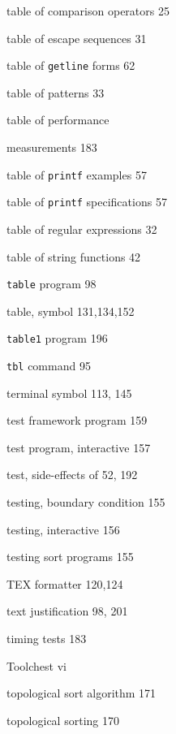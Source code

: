 \begin{multicols}{3}
\hangindent=3pc  table of comparison operators 25

\hangindent=3pc  table of escape sequences 31

\hangindent=3pc  table of \verb'getline' forms 62

\hangindent=3pc  table of patterns 33

\hangindent=3pc  table of performance

\hangindent=3pc  measurements 183

\hangindent=3pc  table of \verb'printf' examples 57

\hangindent=3pc  table of \verb'printf' specifications 57

\hangindent=3pc  table of regular expressions 32

\hangindent=3pc  table of string functions 42

\hangindent=3pc  \verb'table' program 98

\hangindent=3pc  table, symbol 131,134,152

\hangindent=3pc  \verb'table1' program 196

\hangindent=3pc  \verb'tbl' command 95

\hangindent=3pc  terminal symbol 113, 145

\hangindent=3pc  test framework program 159

\hangindent=3pc  test program, interactive 157

\hangindent=3pc  test, side-effects of 52, 192

\hangindent=3pc  testing, boundary condition 155

\hangindent=3pc  testing, interactive 156

\hangindent=3pc  testing sort programs 155

\hangindent=3pc  TEX formatter 120,124

\hangindent=3pc  text justification 98, 201

\hangindent=3pc  timing tests 183

\hangindent=3pc  Toolchest vi

\hangindent=3pc  topological sort algorithm 171

\hangindent=3pc  topological sorting 170


\end{multicols}
